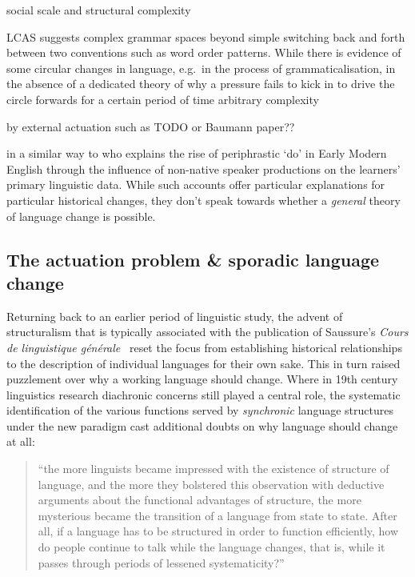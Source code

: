 \citep{Dediu2007}
social scale and structural complexity~\citep{Lupyan2010,Nettle2012}

\citep{Atkinson2016}


LCAS suggests complex grammar spaces beyond simple switching back and forth between two conventions such as word order patterns.
While there is evidence of some circular changes in language, e.g.~in the process of grammaticalisation, in the absence of a dedicated theory of why a pressure fails to kick in to drive the circle forwards for a certain period of time
arbitrary complexity

by external actuation such as \citet{Ritt2004} TODO or Baumann paper??

in a similar way to \citet{Yang2002} who explains the rise of periphrastic `do' in Early Modern English through the influence of non-native speaker productions on the learners' primary linguistic data.
While such accounts offer particular explanations for particular historical changes, they don't speak towards whether a \emph{general} theory of language change is possible.

\subsection{The actuation problem \& sporadic language change}
\label{sec:actuationproblem}

Returning back to an earlier period of linguistic study, the advent of structuralism that is typically associated with the publication of Saussure's \emph{Cours de linguistique générale}~\citeyear{Saussure1916} reset the focus from establishing historical relationships to the description of individual languages for their own sake. This in turn raised puzzlement over why a working language should change. Where in 19th century linguistics research diachronic concerns still played a central role, the systematic identification of the various functions served by \emph{synchronic} language structures under the new paradigm cast additional doubts on why language should change at all:

\begin{quote}
``the more linguists became impressed with the existence of structure of language, and the more they bolstered this observation with deductive arguments about the functional advantages of structure, the more mysterious became the transition of a language from state to state. After all, if a language has to be structured in order to function efficiently, how do people continue to talk while the language changes, that is, while it passes through periods of lessened systematicity?''~\citep[p.100]{Weinreich1968}
\end{quote}

